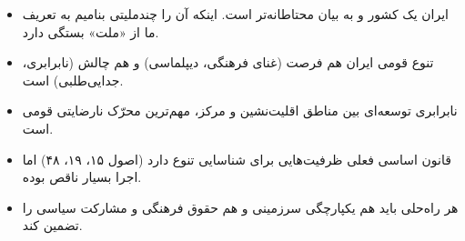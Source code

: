 \simplesep

\begin{lessonbox}
\begin{itemize}
  \item ایران یک کشور  و به بیان محتاطانه‌تر  است. اینکه آن را چندملیتی بنامیم به تعریف ما از «ملت» بستگی دارد.
  \item تنوع قومی ایران هم فرصت (غنای فرهنگی، دیپلماسی) و هم چالش (نابرابری، جدایی‌طلبی) است.
  \item نابرابری توسعه‌ای بین مناطق اقلیت‌نشین و مرکز، مهم‌ترین محرّک نارضایتی قومی است.
  \item قانون اساسی فعلی ظرفیت‌هایی برای شناسایی تنوع دارد (اصول ۱۵، ۱۹، ۴۸) اما اجرا بسیار ناقص بوده.
  \item هر راه‌حلی باید هم یکپارچگی سرزمینی و هم حقوق فرهنگی و مشارکت سیاسی را تضمین کند.
\end{itemize}
\end{lessonbox}